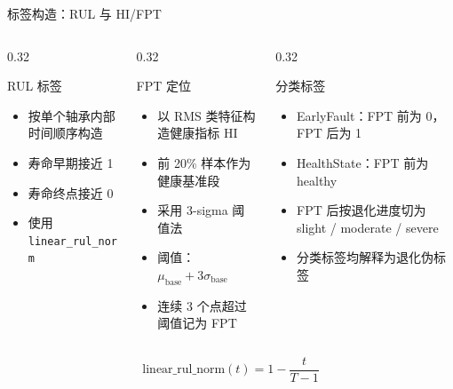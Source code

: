 \documentclass[aspectratio=169,11pt]{ctexbeamer}
\newcommand{\code}[1]{\texttt{#1}}
\begin{document}
\begin{frame}[t]{标签构造：RUL 与 HI/FPT}
  \begin{columns}[T,onlytextwidth]
    \begin{column}{0.32\textwidth}
      \begin{block}{RUL 标签}
        \begin{itemize}
          \item 按单个轴承内部时间顺序构造
          \item 寿命早期接近 1
          \item 寿命终点接近 0
          \item 使用 \code{linear\_rul\_norm}
        \end{itemize}
      \end{block}
    \end{column}
    \begin{column}{0.32\textwidth}
      \begin{block}{FPT 定位}
        \begin{itemize}
          \item 以 RMS 类特征构造健康指标 HI
          \item 前 20\% 样本作为健康基准段
          \item 采用 3-sigma 阈值法
          \item 阈值：$\mu_{\mathrm{base}} + 3\sigma_{\mathrm{base}}$
          \item 连续 3 个点超过阈值记为 FPT
        \end{itemize}
      \end{block}
    \end{column}
    \begin{column}{0.32\textwidth}
      \begin{block}{分类标签}
        \begin{itemize}
          \item EarlyFault：FPT 前为 0，FPT 后为 1
          \item HealthState：FPT 前为 healthy
          \item FPT 后按退化进度切为 slight / moderate / severe
          \item 分类标签均解释为退化伪标签
        \end{itemize}
      \end{block}
    \end{column}
  \end{columns}

  \vspace{0.3em}
  \centering
  \small
  \[
    \mathrm{linear\_rul\_norm}(t)=1-\frac{t}{T-1}
  \]

\end{frame}
\end{document}
